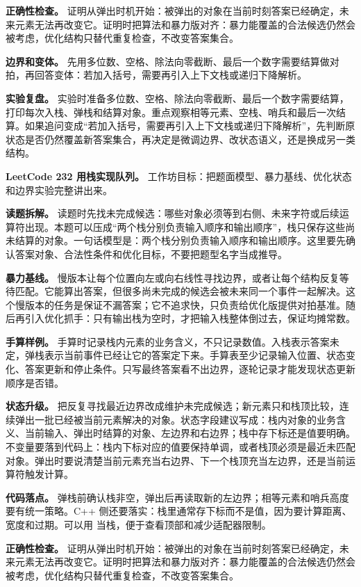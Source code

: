 \textbf{正确性检查。} 证明从弹出时机开始：被弹出的对象在当前时刻答案已经确定，未来元素无法再改变它。证明时把算法和暴力版对齐：暴力能覆盖的合法候选仍然会被考虑，优化结构只替代重复检查，不改变答案集合。

\textbf{边界和变体。} 先用多位数、空格、除法向零截断、最后一个数字需要结算做对拍，再回答变体：若加入括号，需要再引入上下文栈或递归下降解析。

\textbf{实验复盘。} 实验时准备多位数、空格、除法向零截断、最后一个数字需要结算，打印每次入栈、弹栈和结算对象。重点观察相等元素、空栈、哨兵和最后一次结算。如果追问变成“若加入括号，需要再引入上下文栈或递归下降解析”，先判断原状态是否仍然覆盖新答案集合，再决定是微调边界、改状态语义，还是换成另一类结构。

\noindent\textbf{LeetCode 232 用栈实现队列。} 工作坊目标：把题面模型、暴力基线、优化状态和边界实验完整讲出来。

\textbf{读题拆解。} 读题时先找未完成候选：哪些对象必须等到右侧、未来字符或后续运算符出现。本题可以压成“两个栈分别负责输入顺序和输出顺序”，栈只保存这些尚未结算的对象。一句话模型是：两个栈分别负责输入顺序和输出顺序。这里要先确认答案对象、合法性条件和优化目标，不要把题型名字当成推导。

\textbf{暴力基线。} 慢版本让每个位置向左或向右线性寻找边界，或者让每个结构反复等待匹配。它能算出答案，但很多尚未完成的候选会被未来同一个事件一起解决。这个慢版本的任务是保证不漏答案；它不追求快，只负责给优化版提供对拍基准。随后再引入优化抓手：只有输出栈为空时，才把输入栈整体倒过去，保证均摊常数。

\textbf{手算样例。} 手算时记录栈内元素的业务含义，不只记录数值。入栈表示答案未定，弹栈表示当前事件已经让它的答案定下来。手算表至少记录输入位置、状态变化、答案更新和停止条件。只写最终答案看不出边界，逐轮记录才能发现状态更新顺序是否错。

\textbf{状态升级。} 把反复寻找最近边界改成维护未完成候选；新元素只和栈顶比较，连续弹出一批已经被当前元素解决的对象。状态字段建议写成：栈内对象的业务含义、当前输入、弹出时结算的对象、左边界和右边界；栈中存下标还是值要明确。不变量要落到代码上：栈内下标对应的值要保持单调，或者栈顶必须是最近未匹配对象。弹出时要说清楚当前元素充当右边界、下一个栈顶充当左边界，还是当前运算符触发计算。

\textbf{代码落点。} 弹栈前确认栈非空，弹出后再读取新的左边界；相等元素和哨兵高度要有统一策略。C++ 侧还要落实：栈里通常存下标而不是值，因为要计算距离、宽度和过期。可以用  当栈，便于查看顶部和减少适配器限制。

\textbf{正确性检查。} 证明从弹出时机开始：被弹出的对象在当前时刻答案已经确定，未来元素无法再改变它。证明时把算法和暴力版对齐：暴力能覆盖的合法候选仍然会被考虑，优化结构只替代重复检查，不改变答案集合。

